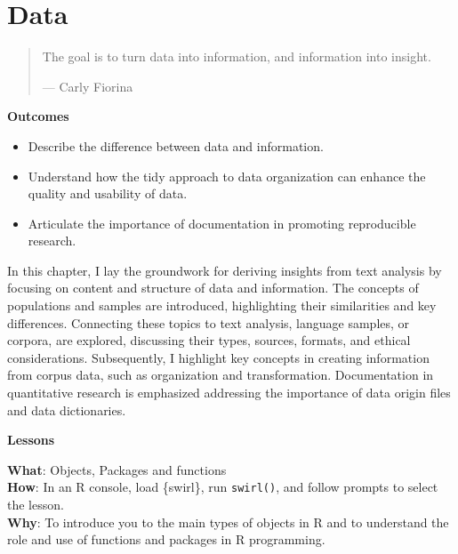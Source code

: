 \documentclass[
  letterpaper,
]{latex/krantz}
\providecommand{\tightlist}{%
  \setlength{\itemsep}{0pt}\setlength{\parskip}{0pt}}\usepackage{longtable,booktabs,array}
\theoremstyle{definition}
\theoremstyle{remark}
\begin{document}
\chapter{Data}\label{sec-data-chapter}

\begin{quote}
The goal is to turn data into information, and information into insight.

--- Carly Fiorina
\end{quote}

\begin{tcolorbox}[enhanced jigsaw, colback=white, opacityback=0, bottomrule=.15mm, rightrule=.15mm, breakable, left=2mm, arc=.35mm, colframe=quarto-callout-color-frame, leftrule=.75mm, toprule=.15mm]

\textbf{ Outcomes}

\begin{itemize}
\tightlist
\item
  Describe the difference between data and information.
\item
  Understand how the tidy approach to data organization can enhance the
  quality and usability of data.
\item
  Articulate the importance of documentation in promoting reproducible
  research.
\end{itemize}

\end{tcolorbox}

In this chapter, I lay the groundwork for deriving insights from text
analysis by focusing on content and structure of data and information.
The concepts of populations and samples are introduced, highlighting
their similarities and key differences. Connecting these topics to text
analysis, language samples, or corpora, are explored, discussing their
types, sources, formats, and ethical considerations. Subsequently, I
highlight key concepts in creating information from corpus data, such as
organization and transformation. Documentation in quantitative research
is emphasized addressing the importance of data origin files and data
dictionaries.

\begin{tcolorbox}[enhanced jigsaw, colback=white, opacityback=0, bottomrule=.15mm, rightrule=.15mm, breakable, left=2mm, arc=.35mm, colframe=quarto-callout-color-frame, leftrule=.75mm, toprule=.15mm]

\textbf{ Lessons}

\textbf{What}: Objects, Packages and functions\\
\textbf{How}: In an R console, load \{swirl\}, run \texttt{swirl()}, and
follow prompts to select the lesson.\\
\textbf{Why}: To introduce you to the main types of objects in R and to
understand the role and use of functions and packages in R programming.

\end{tcolorbox}
\end{document}
